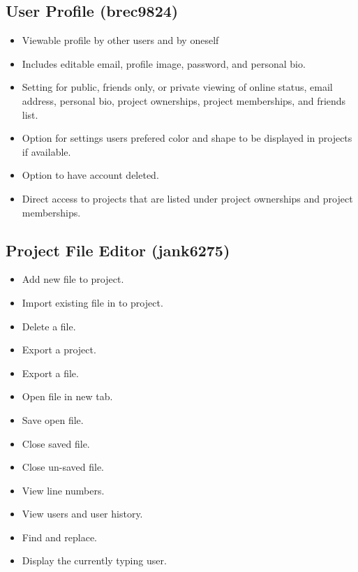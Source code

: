 \documentclass[11pt]{report}
\begin{document}
    \subsection{User Profile (brec9824)}
        \begin{itemize}
            \item Viewable profile by other users and by oneself
            \item Includes editable email, profile image, password, and personal bio.
            \item Setting for public, friends only, or private viewing of online status, email address, personal bio, project ownerships, project memberships, and friends list.
            \item Option for settings users prefered color and shape to be displayed in projects if available.
            \item Option to have account deleted.
        	\item Direct access to projects that are listed under project ownerships and project memberships.
        \end{itemize}
    \subsection{Project File Editor (jank6275)}
        \begin{itemize}
            \item Add new file to project.
            \item Import existing file in to project.
            \item Delete a file.
            \item Export a project.
            \item Export a file.
            \item Open file in new tab.
            \item Save open file.
            \item Close saved file.
            \item Close un-saved file.
            \item View line numbers.
            \item View users and user history.
            \item Find and replace.
            \item Display the currently typing user.
        \end{itemize}
\end{document}
